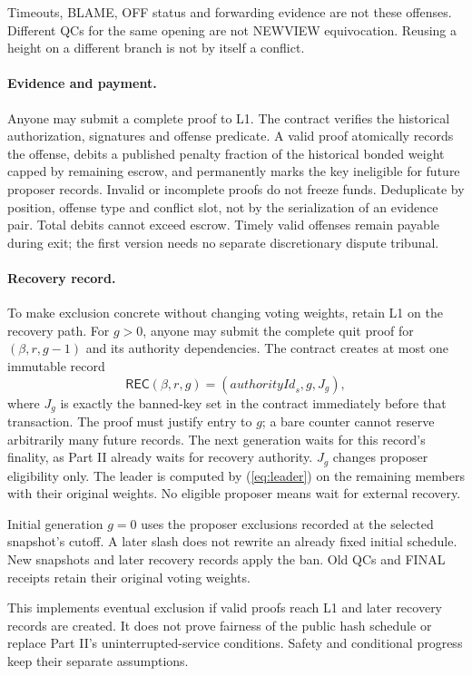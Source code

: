 \documentclass[11pt,a4paper]{article}
\newcommand{\tagg}[1]{\mathsf{#1}}
\begin{document}
Timeouts, BLAME, OFF status and forwarding evidence are not these offenses.
Different QCs for the same opening are not NEWVIEW equivocation. Reusing a
height on a different branch is not by itself a conflict.

\paragraph{Evidence and payment.}
Anyone may submit a complete proof to L1. The contract verifies the
historical authorization, signatures and offense predicate. A valid proof
atomically records the offense, debits a published penalty fraction of
the historical bonded weight capped by remaining escrow, and permanently
marks the key ineligible for future proposer records. Invalid or incomplete
proofs do not freeze funds. Deduplicate by position, offense type and
conflict slot, not by the serialization of an evidence pair. Total debits
cannot exceed escrow. Timely valid offenses remain payable during exit;
the first version needs no separate discretionary dispute tribunal.

\paragraph{Recovery record.}
To make exclusion concrete without changing voting weights, retain L1 on
the recovery path. For $g>0$, anyone may submit the complete quit proof
for $(\beta,r,g-1)$ and its authority dependencies. The contract creates
at most one immutable record
\[
 \tagg{REC}(\beta,r,g)=(\mathit{authorityId}_s,g,J_g),
\]
where $J_g$ is exactly the banned-key set in the contract immediately
before that transaction. The proof must justify entry to $g$; a bare
counter cannot reserve arbitrarily many future records. The next
generation waits for this record's finality, as Part II already waits for
recovery authority. $J_g$ changes proposer eligibility only. The leader
is computed by (\ref{eq:leader}) on the remaining members with their
original weights. No eligible proposer means wait for external recovery.

Initial generation $g=0$ uses the proposer exclusions recorded at the
selected snapshot's cutoff. A later slash does not rewrite an already
fixed initial schedule. New snapshots and later recovery records apply
the ban. Old QCs and FINAL receipts retain their original voting weights.

This implements eventual exclusion if valid proofs reach L1 and later
recovery records are created. It does not prove fairness of the public
hash schedule or replace Part II's uninterrupted-service conditions.
Safety and conditional progress keep their separate assumptions.
\end{document}
